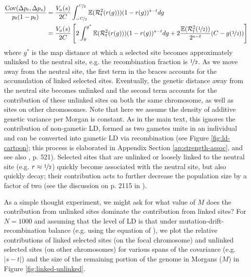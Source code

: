 \documentclass[11pt]{article}
\newcommand{\E}{\mathbb{E}}
\DeclareMathOperator{\cov}{Cov}
\begin{document}
  \begin{align}
    \frac{\cov(\Delta p_t, \Delta p_s)}{p_t(1-p_t) } &= \frac{V_a(s)}{2C} \int_{-\nicefrac{C}{2}}^{\nicefrac{C}{2}} \E(\mathcal{R}^2_{t}(r(g))) (1-r(g))^{s-t} d g \\
                                                     &= \frac{V_a(s)}{2C} \left[ 2 \int_{0}^{g^*} \E(\mathcal{R}^2_{t}(r(g))) (1-r(g))^{s-t} d g  + 2 \frac{\E(\mathcal{R}^2_{t}(\nicefrac{1}{2}))}{2^{s-t}} (C - g(\nicefrac{1}{2})) \right]  \label{eq:rel-contributions}
  \end{align}
%
where $g^*$ is the map distance at which a selected site becomes approximately
unlinked to the neutral site, e.g. the recombination fraction is
$\nicefrac{1}{2}$. As we move away from the neutral site, the first term in the
braces accounts for the accumulation of linked selected sites. Eventually, the
genetic distance away from the neutral site becomes unlinked and the second
term accounts for the contribution of these unlinked sites on both the same
chromosome, as well as sites on other chromosomes. Note that here we assume the
density of additive genetic variance per Morgan is constant. As in the main
text, this ignores the contribution of non-gametic LD, formed as two gametes
unite in an individual and can be converted into gametic LD via recombination
(see Figure \ref{fig:ld-cartoon}; this process is elaborated in Appendix
Section \ref{ap:strength-assoc}, and see also \cite{Tenesa2007-nl}, p.  521).
Selected sites that are unlinked or loosely linked to the neutral site (e.g. $r
\approx \nicefrac{1}{2}$) quickly become associated with the neutral site, but
also quickly decay; their contribution acts to further decrease the population
size by a factor of two (see the discussion on p. 2115 in
\cite{Santiago1998-bs}).

As a simple thought experiment, we might ask for what value of $M$ does
the contribution from unlinked sites dominate the contribution from linked
sites? For $N=1000$ and assuming that the level of LD is that under
mutation-drift-recombination balance (e.g. using the equation of
\citeauthor{Tomoko_Ohta1971-hb}), we plot the relative contributions of linked
selected sites (on the focal chromosome) and unlinked selected sites (on other
chromosomes) for various spans of the covariance (e.g.  $|s-t|$) and the size
of the remaining portion of the genome in Morgans ($M$) in Figure
\ref{fig:linked-unlinked}.
\end{document}

